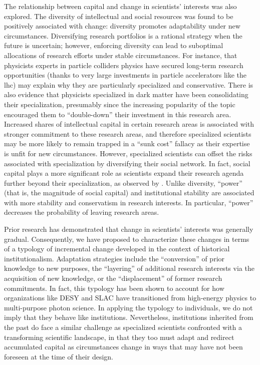 \documentclass{article}
\begin{document}
The relationship between capital and change in scientists' interests was also explored. The diversity of intellectual and social resources was found to be positively associated with change: diversity promotes adaptability under new circumstances. Diversifying research portfolios is a rational strategy when the future is uncertain; however, enforcing diversity can lead to suboptimal allocations of research efforts under stable circumstances. For instance, that physicists experts in particle colliders physics have secured long-term research opportunities (thanks to very large investments in particle accelerators like the \gls{lhc}) may explain why they are particularly specialized and conservative. There is also evidence that physicists specialized in dark matter have been consolidating their specialization, presumably since the increasing popularity of the topic encouraged them to ``double-down'' their investment in this research area. Increased shares of intellectual capital in certain research areas is associated with stronger commitment to these research areas, and therefore specialized scientists may be more likely to remain trapped in a ``sunk cost'' fallacy as their expertise is unfit for new circumstances. However, specialized scientists can offset the risks associated with specialization by diversifying their social network. In fact, social capital plays a more significant role as scientists expand their research agenda further beyond their specialization, as observed by \citealt{Tripodi2020}. Unlike diversity, ``power'' (that is, the magnitude of social capital) and institutional stability are associated with more stability and conservatism in research interests. In particular, ``power'' decreases the probability of leaving research areas.

Prior research has demonstrated that change in scientists' interests was generally gradual. Consequently, we have proposed to characterize these changes in terms of a typology of incremental change developed in the context of historical institutionalism. Adaptation strategies include the ``conversion'' of prior knowledge to new purposes, the ``layering'' of additional research interests via the acquisition of new knowledge, or the ``displacement'' of former research commitments. In fact, this typology has been shown to account for how organizations like DESY and SLAC have transitioned from high-energy physics to multi-purpose photon science. In applying the typology to individuals, we do not imply that they behave like institutions. Nevertheless, institutions inherited from the past do face a similar challenge as specialized scientists confronted with a transforming scientific landscape, in that they too must  adapt and redirect accumulated capital as circumstances change in ways that may have not been foreseen at the time of their design.
\end{document}
